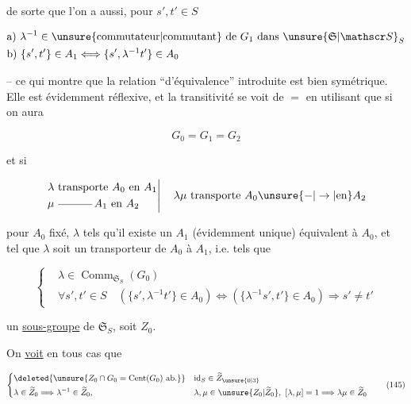 de sorte que l'on a aussi, pour $s',t'\in S$

\[
 \begin{aligned}
 &\text{a) }\lambda^{-1}\in\text{\unsure{commutateur|commutant} de }G_1\text{ dans }\unsure{\mathfrak S|\mathscr S}_S\\
 &\text{b) }\{s',t'\}\in A_1\Longleftrightarrow\{s',\lambda^{-1}t'\}\in A_0
 \end{aligned}
\]

-- ce qui montre que la relation ``d'équivalence'' introduite est bien symétrique. Elle est évidemment réflexive, et la transitivité se voit de $=$ en utilisant que si    on aura

\[
 G_0=G_1=G_2
\]

et si

\[
 \left.\begin{aligned}
 \lambda\ &\text{transporte }A_0\text{ en }A_1\\
 \mu\ &\rule[.45ex]{3.1em}{.35pt}\,A_1\text{ en }A_2
 \end{aligned}\right|\quad\lambda\mu\text{ transporte }A_0\unsure{-|\to|\text{en}}A_2
\]

  pour $A_0$ fixé,    $\lambda$ tels qu'il  existe un $A_1$ (évidemment unique) équivalent à $A_0$, et tel que $\lambda$ soit un transporteur de $A_0$ à $A_1$, i.e. \inserted{$\lambda$} tels que

\[
 \left\{\begin{aligned}
 &\lambda\in\operatorname{Comm}_{\mathfrak S_S}(G_0)\\
 &\forall s',t'\in S\quad
 (\{s',\lambda^{-1}t'\}\in A_0)\Longleftrightarrow
 (\{\lambda^{-1}s',t'\}\in A_0)\Longrightarrow s'\ne t'
 \end{aligned}\right.
 \tag*{(144)}
\]



  un \uline{sous-groupe} de $\mathfrak S_S$, soit $Z_0$.

On \uline{voit} en tous cas que

\[
 \left\{\begin{aligned}
 &\deleted{\unsure{Z_0\cap G_0=\operatorname{Cent}(G_0)\ \text{ab.}}}
 &&\mathrm{id}_S\in\widetilde Z_{\unsure{0|3}}\\
 &\lambda\in\widetilde Z_0\Longrightarrow\lambda^{-1}\in\widetilde Z_0,\qquad
 &&\lambda,\mu\in\unsure{Z_0|\widetilde Z_0},\ [\lambda,\mu]=1\Longrightarrow\lambda\mu\in\widetilde Z_0
 \end{aligned}\right.
 \tag*{(145)}
\]

